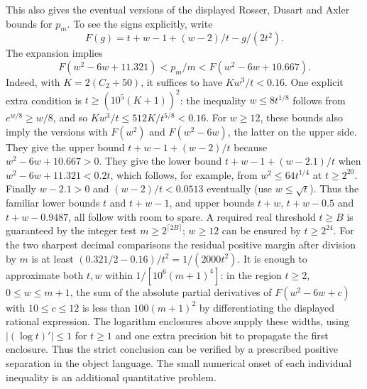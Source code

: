 This also gives the eventual versions of the displayed Rosser, Dusart and Axler bounds for $p_m$. To see the signs explicitly, write
\[
 F(g)=t+w-1+(w-2)/t-g/(2t^2).
\]
The expansion implies
\[
 F(w^2-6w+11.321)<p_m/m<F(w^2-6w+10.667).
\]
Indeed, with $K=2(C_2+50)$, it suffices to have $Kw^3/t<0.16$. One explicit extra condition is $t\ge(10^5(K+1))^2$: the inequality $w\le8t^{1/8}$ follows from $e^{w/8}\ge w/8$, and so $Kw^3/t\le512K/t^{5/8}<0.16$. For $w\ge12$, these bounds also imply the versions with $F(w^2)$ and $F(w^2-6w)$, the latter on the upper side. They give the upper bound $t+w-1+(w-2)/t$ because $w^2-6w+10.667>0$. They give the lower bound $t+w-1+(w-2.1)/t$ when $w^2-6w+11.321<0.2t$, which follows, for example, from $w^2\le64t^{1/4}$ at $t\ge 2^{20}$. Finally $w-2.1>0$ and $(w-2)/t<0.0513$ eventually (use $w\le\sqrt t$). Thus the familiar lower bounds $t$ and $t+w-1$, and upper bounds $t+w$, $t+w-0.5$ and $t+w-0.9487$, all follow with room to spare. A required real threshold $t\ge B$ is guaranteed by the integer test $m\ge2^{\lceil2B\rceil}$; $w\ge12$ can be ensured by $t\ge2^{24}$. For the two sharpest decimal comparisons the residual positive margin after division by $m$ is at least $(0.321/2-0.16)/t^2=1/(2000t^2)$. It is enough to approximate both $t,w$ within $1/[10^6(m+1)^4]$: in the region $t\ge2$, $0\le w\le m+1$, the sum of the absolute partial derivatives of $F(w^2-6w+c)$ with $10\le c\le12$ is less than $100(m+1)^2$ by differentiating the displayed rational expression. The logarithm enclosures above supply these widths, using $|(\log t)'|\le1$ for $t\ge1$ and one extra precision bit to propagate the first enclosure. Thus the strict conclusion can be verified by a prescribed positive separation in the object language. The small numerical onset of each individual inequality is an additional quantitative problem.
